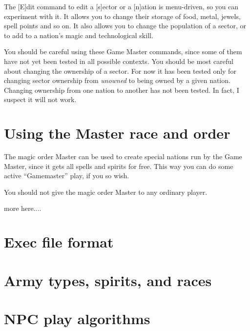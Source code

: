 The [E]dit command to edit a [s]ector or a [n]ation is menu-driven, so
you can experiment with it.  It allows you to change their storage of
food, metal, jewels, spell points and so on.  It also allows you to
change the population of a sector, or to add to a nation's magic and
technological skill.

You should be careful using these Game Master commands, since some of
them have not yet been tested in all possible contexts.  You should be
most careful about changing the ownership of a sector.  For now it has
been tested only for changing sector ownership from {\em unowned} to
being owned by a given nation.  Changing ownership from one nation to
another has not been tested.  In fact, I suspect it will not work.

\chapter{Using the Master race and order}

The magic order Master can be used to create special nations run by
the Game Master, since it gets all spells and spirits for free.  This
way you can do some active ``Gamemaster'' play, if you so wish.

You should not give the magic order Master to any ordinary player.

more here....

\chapter{Exec file format}

\chapter{Army types, spirits, and races}

\chapter{NPC play algorithms}

